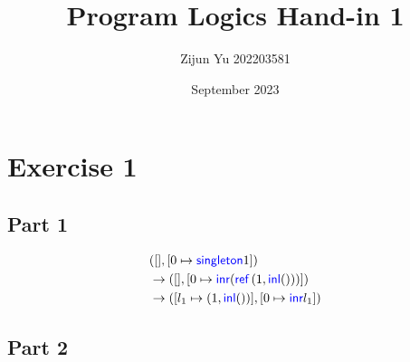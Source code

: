 \documentclass{article}
\title{Program Logics Hand-in 1}
\author{Zijun Yu 202203581}
\date{September 2023}
\begin{document}


\maketitle

\section*{Exercise 1}

\subsection*{Part 1}

\begin{align*}
     & ([], [0 \mapsto \langkw{singleton} 1])                      \\
     & \cstepsto ([], [0 \mapsto \Inr (\Ref (1, \Inl ()))])        \\
     & \cstepsto ([l_1 \mapsto (1, \Inl())], [0 \mapsto \Inr l_1])
\end{align*}

\subsection*{Part 2}
\end{document}
